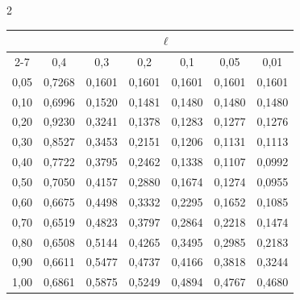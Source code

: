 \begin{multicols}{2}
\begin{table}[b]
\begin{center}
\vspace*{2ex}








\tabcolsep=19pt


\begin{tabular}{|c|c|c|c|c|c|c|}


\hline


 & \multicolumn {6}{c|}{$\ell$}\\


 \cline{2-7}


\multicolumn{1}{|c|}{\raisebox{4pt}[0pt][0pt]{$\delta$}}&0,4&0,3&0,2&0,1&0,05&0,01\\ 


\hline


0,05&0,7268&0,1601&0,1601&0,1601&0,1601&0,1601\\


0,10&0,6996&0,1520&0,1481&0,1480&0,1480&0,1480\\


0,20&0,9230&0,3241&0,1378&0,1283&0,1277&0,1276\\


0,30&0,8527&0,3453&0,2151&0,1206&0,1131&0,1113\\


0,40&0,7722&0,3795&0,2462&0,1338&0,1107&0,0992\\


0,50&0,7050&0,4157&0,2880&0,1674&0,1274&0,0955\\


0,60&0,6675&0,4498&0,3332&0,2295&0,1652&0,1085\\


0,70&0,6519&0,4823&0,3797&0,2864&0,2218&0,1474\\


0,80&0,6508&0,5144&0,4265&0,3495&0,2985&0,2183\\


0,90&0,6611&0,5477&0,4737&0,4166&0,3818&0,3244\\


1,00&0,6861&0,5875&0,5249&0,4894&0,4767&0,4680\\


\hline


\end{tabular}


\end{center}


\end{table}






\end{multicols}
